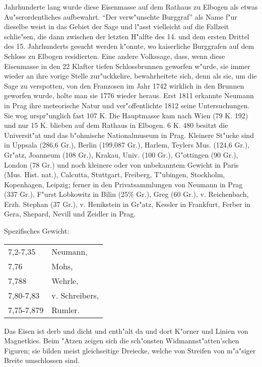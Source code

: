 \documentclass[a4paper, 11pt, oneside]{article}
\begin{document}
Jahrhunderte lang wurde diese Eisenmasse auf dem Rathaus zu Elbogen als etwas Au"serordentliches aufbewahrt. "`Der verw"unschte Burggraf"' als Name f"ur dieselbe weist in das Gebiet der Sage und l"asst vielleicht auf die Fallzeit schlie"sen, die dann zwischen der letzten H"alfte des 14. und dem ersten Drittel des 15. Jahrhunderts gesucht werden k"onnte, wo kaiserliche Burggrafen auf dem Schloss zu Elbogen residierten. Eine andere Volkssage, dass, wenn diese Eisenmasse in den 22 Klafter tiefen Schlossbrunnen geworfen w"urde, sie immer wieder an ihre vorige Stelle zur"uckkehre, bewahrheitete sich, denn als sie, um die Sage zu verspotten, von den Franzosen im Jahr 1742 wirklich in den Brunnen geworfen wurde, holte man sie 1776 wieder heraus. Erst 1811 erkannte Neumann in Prag ihre meteorische Natur und ver"offentlichte 1812 seine Untersuchungen. Sie wog urspr"unglich fast 107 K. Die Hauptmasse kam nach Wien (79 K. 192) und nur 15 K. blieben auf dem Rathaus in Elbogen. 6 K. 480 besitzt die Universit"at und das b"ohmische Nationalmuseum in Prag. Kleinere St"ucke sind in Uppsala (286,6 Gr.), Berlin (199,087 Gr.), Harlem, Teylers Mus. (124,6 Gr.), Gr"atz, Joanneum (108 Gr.), Krakau, Univ. (100 Gr.), G"ottingen (90 Gr.), London (78 Gr.) und noch kleinere oder von unbekanntem Gewicht in Paris (Mus. Hist. nat.), Calcutta, Stuttgart, Freiberg, T"ubingen, Stockholm, Kopenhagen, Leipzig; ferner in den Privatsammlungen von Neumann in Prag (337 Gr.), F"urst Lobkowitz in Bilin (25\% Gr.), Greg (60 Gr.), v. Reichenbach, Erzh. Stephan (37 Gr.), v. Henikstein in Gr"atz, Kessler in Frankfurt, Ferber in Gera, Shepard, Nevill und Zeidler in Prag.

Spezifisches Gewicht:  
\begin{table}[!ht]
    \centering\swabfamily\Large
    \begin{tabular}{l l}
        7,2-7,35 & Neumann,\\
        7,76 & Mohs,\\
        7,788 & Wehrle,\\
        7,80-7,83 & v. Schreibers,\\
        7,75-7,879 & Rumler.
    \end{tabular}
\end{table}

Das Eisen ist derb und dicht und enth"alt da und dort K"orner und Linien von Magnetkies. Beim "Atzen zeigen sich die sch"onsten Widmannst"atten'schen Figuren; sie bilden meist gleichseitige Dreiecke, welche von Streifen von m"a"siger Breite umschlossen sind.
\end{document}
